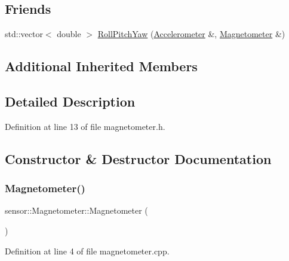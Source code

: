\subsection*{Friends}
\begin{DoxyCompactItemize}
\item 
std\+::vector$<$ double $>$ \hyperlink{classsensor_1_1_magnetometer_af6581f59b9f71cabfa36a46d177deb5f}{Roll\+Pitch\+Yaw} (\hyperlink{classsensor_1_1_accelerometer}{Accelerometer} \&, \hyperlink{classsensor_1_1_magnetometer}{Magnetometer} \&)
\end{DoxyCompactItemize}
\subsection*{Additional Inherited Members}


\subsection{Detailed Description}


Definition at line 13 of file magnetometer.\+h.



\subsection{Constructor \& Destructor Documentation}
\mbox{\label{classsensor_1_1_magnetometer_a09d5d8674a21e70460745081ac759d87}} 
\subsubsection{\texorpdfstring{Magnetometer()}{Magnetometer()}\hspace{0.1cm}{\footnotesize\ttfamily [1/2]}}
{\footnotesize\ttfamily sensor\+::\+Magnetometer\+::\+Magnetometer (\begin{DoxyParamCaption}{ }\end{DoxyParamCaption})}



Definition at line 4 of file magnetometer.\+cpp.

\mbox{\label{classsensor_1_1_magnetometer_a30b9846b3bbecf844e10845f47ff0bf5}} 
